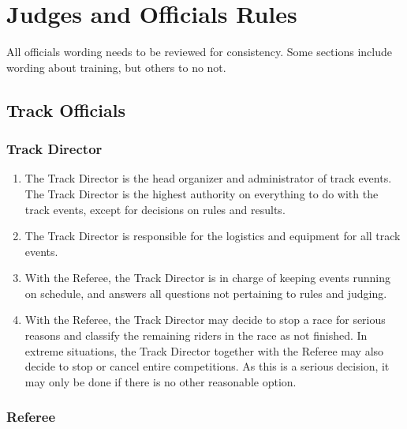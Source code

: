 \chapter{Judges and Officials Rules}

\begin{comment2016}
	All officials wording needs to be reviewed for consistency.
	Some sections include wording about training, but others to no not.
\end{comment2016}

\section{Track Officials}

\subsection{Track Director}

\begin{enumerate}[leftmargin=1.5em,labelsep=*]
	\item The Track Director is the head organizer and administrator of track events. 
    The Track Director is the highest authority on everything to do with the track events, 
    except for decisions on rules and results.

	\item The Track Director is responsible for the logistics and equipment for all track events.

	\item With the Referee, the Track Director is in charge of keeping events running on schedule, 
    and answers all questions not pertaining to rules and judging.
	
	\item With the Referee, the Track Director may decide to stop a race for 
    serious reasons and classify the remaining riders in the race as not finished.
	In extreme situations, the Track Director together with the Referee may also decide to stop or 
    cancel entire competitions.
	As this is a serious decision, it may only be done if there is no other reasonable option.
\end{enumerate}

\subsection{Referee}

